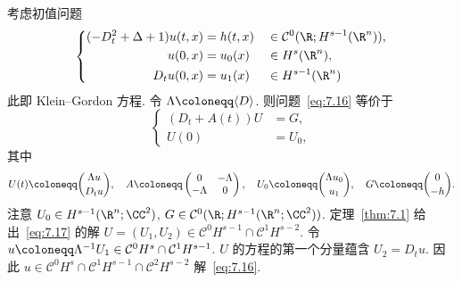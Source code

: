 \begin{example}\label{eg:7.4}
考虑初值问题
\begin{equation}\label{eq:7.16}
    \left\{
    \begin{aligned}
        (-D_t^2 + \Delta + 1) u(t, x) &= h(t, x) &&\in \mathcal{C}^0(\R; H^{s-1}(\R^n)), \\
        u(0, x) &= u_0(x) &&\in H^s(\R^n), \\
        D_t u(0, x) &= u_1(x) &&\in H^{s-1}(\R^n)
    \end{aligned}
    \right.
\end{equation}
此即 Klein--Gordon 方程. 令 $\Lambda \defeq \langle D \rangle$. 则问题~\eqref{eq:7.16} 等价于
\begin{equation}\label{eq:7.17}
    \left\{
    \begin{aligned}
        (D_t + A(t)) U &= G, \\
        U(0) &= U_0,
    \end{aligned}
    \right.
\end{equation}
其中
\begin{equation}\label{eq:7.18}
    U(t) \defeq \binom{\Lambda u}{D_t u}, \quad
    A \defeq \begin{pmatrix} 0 & -\Lambda \\ -\Lambda & 0 \end{pmatrix}, \quad
    U_0 \defeq \binom{\Lambda u_0}{u_1}, \quad
    G \defeq \binom{0}{-h}.
\end{equation}
注意 $U_0 \in H^{s-1}(\R^n; \CC^2)$, $G \in \mathcal{C}^0(\R; H^{s-1}(\R^n; \CC^2))$. 定理~\ref{thm:7.1} 给出~\eqref{eq:7.17} 的解 $U = (U_1, U_2) \in \mathcal{C}^0 H^{s-1} \cap \mathcal{C}^1 H^{s-2}$. 令 $u \defeq \Lambda^{-1} U_1 \in \mathcal{C}^0 H^s \cap \mathcal{C}^1 H^{s-1}$. $U$ 的方程的第一个分量蕴含 $U_2 = D_t u$. 因此 $u \in \mathcal{C}^0 H^s \cap \mathcal{C}^1 H^{s-1} \cap \mathcal{C}^2 H^{s-2}$ 解~\eqref{eq:7.16}.
\end{example}

